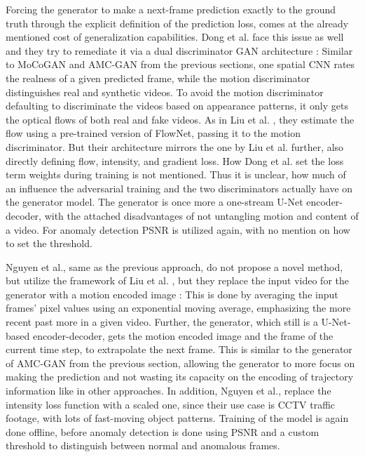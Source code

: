 Forcing the generator to make a next-frame prediction exactly to the ground truth through the explicit definition of the prediction loss, comes at the already mentioned cost of generalization capabilities. Dong et al. face this issue as well and they try to remediate it via a dual discriminator GAN architecture \cite{dong2020dual}: Similar to MoCoGAN and AMC-GAN from the previous sections, one spatial CNN rates the realness of a given predicted frame, while the motion discriminator distinguishes real and synthetic videos. To avoid the motion discriminator defaulting to discriminate the videos based on appearance patterns, it only gets the optical flows of both real and fake videos. As in Liu et al. \cite{liu2018future}, they estimate the flow using a pre-trained version of FlowNet, passing it to the motion discriminator. But their architecture mirrors the one by Liu et al. further, also directly defining flow, intensity, and gradient loss. How Dong et al. set the loss term weights during training is not mentioned. Thus it is unclear, how much of an influence the adversarial training and the two discriminators actually have on the generator model. The generator is once more a one-stream U-Net encoder-decoder, with the attached disadvantages of not untangling motion and content of a video. For anomaly detection PSNR is utilized again, with no mention on how to set the threshold.

Nguyen et al., same as the previous approach, do not propose a novel method, but utilize the framework of Liu et al. \cite{liu2018future}, but they replace the input video for the generator with a motion encoded image \cite{nguyen2020anomaly}:  This is done by averaging the input frames' pixel values using an exponential moving average, emphasizing the more recent past more in a given video. Further, the generator, which still is a U-Net-based encoder-decoder, gets the motion encoded image and the frame of the current time step, to extrapolate the next frame. This is similar to the generator of AMC-GAN from the previous section, allowing the generator to more focus on making the prediction and not wasting its capacity on the encoding of trajectory information like in other approaches. In addition, Nguyen et al., replace the intensity loss function with a scaled one, since their use case is CCTV traffic footage, with lots of fast-moving object patterns. Training of the model is again done offline, before anomaly detection is done using PSNR and a custom threshold to distinguish between normal and anomalous frames.

